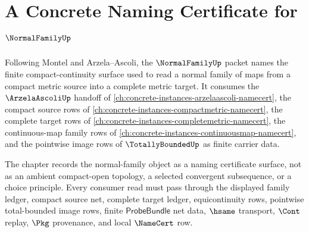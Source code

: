 \chapter{A Concrete Naming Certificate for $\NormalFamilyUp$}
\label{ch:concrete-instances-normal-family-namecert}

Following Montel and Arzela--Ascoli, the $\NormalFamilyUp$ packet names the finite compact-continuity surface used to read a normal family of maps from a compact metric source into a complete metric target. It consumes the $\ArzelaAscoliUp$ handoff of \autoref{ch:concrete-instances-arzelaascoli-namecert}, the compact source rows of \autoref{ch:concrete-instances-compactmetric-namecert}, the complete target rows of \autoref{ch:concrete-instances-completemetric-namecert}, the continuous-map family rows of \autoref{ch:concrete-instances-continuousmap-namecert}, and the pointwise image rows of $\TotallyBoundedUp$ as finite carrier data.

The chapter records the normal-family object as a naming certificate surface, not as an ambient compact-open topology, a selected convergent subsequence, or a choice principle. Every consumer read must pass through the displayed family ledger, compact source net, complete target ledger, equicontinuity rows, pointwise total-bounded image rows, finite $\mathsf{ProbeBundle}$ net data, $\hsame$ transport, $\Cont$ replay, $\Pkg$ provenance, and local $\NameCert$ row.

